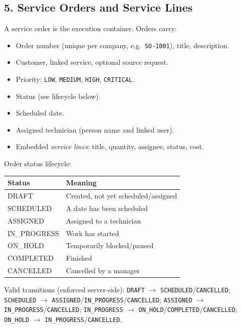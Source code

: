 \documentclass[11pt,a4paper]{article}
\begin{document}
\subsection{5. Service Orders and Service Lines}
\label{sec:orders}

A service order is the execution container. Orders carry:

\begin{itemize}[leftmargin=2em, itemsep=2pt]
  \item Order number (unique per company, e.g.\ \texttt{SO-1001}), title, description.
  \item Customer, linked service, optional source request.
  \item Priority: \texttt{LOW}, \texttt{MEDIUM}, \texttt{HIGH}, \texttt{CRITICAL}.
  \item Status (see lifecycle below).
  \item Scheduled date.
  \item Assigned technician (person name and linked user).
  \item Embedded \emph{service lines}: title, quantity, assignee, status, cost.
\end{itemize}

Order status lifecycle:

\begin{longtable}{@{}L{3.2cm}L{11.2cm}@{}}
  \toprule
  \textbf{Status} & \textbf{Meaning} \\
  \midrule
  \endhead
  DRAFT & Created, not yet scheduled/assigned \\
  SCHEDULED & A date has been scheduled \\
  ASSIGNED & Assigned to a technician \\
  IN\_PROGRESS & Work has started \\
  ON\_HOLD & Temporarily blocked/paused \\
  COMPLETED & Finished \\
  CANCELLED & Cancelled by a manager \\
  \bottomrule
\end{longtable}

Valid transitions (enforced server-side):
\texttt{DRAFT} $\rightarrow$ \texttt{SCHEDULED}/\texttt{CANCELLED}; \texttt{SCHEDULED} $\rightarrow$ \texttt{ASSIGNED}/\texttt{IN\_PROGRESS}/\texttt{CANCELLED}; \texttt{ASSIGNED} $\rightarrow$ \texttt{IN\_PROGRESS}/\texttt{CANCELLED}; \texttt{IN\_PROGRESS} $\rightarrow$ \texttt{ON\_HOLD}/\texttt{COMPLETED}/\texttt{CANCELLED}; \texttt{ON\_HOLD} $\rightarrow$ \texttt{IN\_PROGRESS}/\texttt{CANCELLED}.
\end{document}
